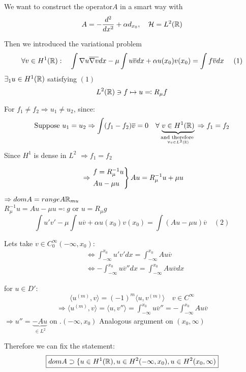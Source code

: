 We want to construct the operator$A$ in a smart way with
	\[ A = - \frac{d^{2}}{dx^{2}} + \alpha d_{x_{0}}, \quad \mathcal{H} = L^{2}(\mathbb{R}) \]
	
Then we introduced the variational problem
	\[ \forall v \in H^{1}(\R): \quad \int \nabla u \overline{\nabla v}dx - \mu \int u \overline{v} dx + \alpha u(x_{0}) v(x_{0}) = \int f \overline{v} dx \quad (1) \]
$\exists_{1} u \in H^{1}(\mathbb{R})$ satisfying $(1)$
	\[ L^{2}(\mathbb{R}) \ni f \mapsto u \eqqcolon R_{\mu} f \]
	
For $f_{1} \neq f_{2} \Rightarrow u_{1} \neq u_{2}$, since:
	\[ \text{Suppose } u_{1} = u_{2} \Rightarrow \int (f_{1} - f_{2}) \overline{v} = 0 \quad \forall \underbrace{v \in H^{1}(\mathbb{R})}_{\underset{\forall v \in L^{2}(\mathbb{R})}{\text{and therefore }}} \Rightarrow f_{1} = f_{2} \]
Since $H^{1}$  is dense in $L^{2}$ $\Longrightarrow f_{1} = f_{2}$

	\[ \Rightarrow \begin{rcases*} f = R^{-1}_{\mu} u \\ A u - \mu u \end{rcases*} Au = R_{\mu}^{-1} u + \mu u \]
	
$\Rightarrow dom A = range A\mathbb{R}_{mu}$ \\
$R_{\mu}^{-1} u = Au - \mu u \eqqcolon g$ or $u = R_{\mu}g$ \\
	\[ \int u' v' - \mu \int u \overline{v} + \alpha u(x_{0}) v(x_{0}) = \int \left( Au - \mu u \right)\overline{v} \quad (2) \]
	
Lets take $v \in C_{0}^{\infty}(-\infty, x_{0})$: 
\begin{align*}
	& \Leftrightarrow \int_{-\infty}^{x_{0}} u' v' dx = \int_{-\infty}^{x_{0}} A u \overline{v} \\
	& \Leftrightarrow - \int_{-\infty}^{x_{0}} u \overline{v}'' dx = \int_{-\infty}^{x_{0}} Au \overline{v} dx
\end{align*}

for $u \in D'$:
	\[ \langle u^{(m)} , v\rangle = (-1)^{m} \langle u , v^{(m)} \rangle \quad v \in C^{\infty} \]
\begin{align*}
	\Rightarrow \langle u^{(m)} , v \rangle = \langle u , v'' \rangle = \int_{-\infty}^{x_{0}} u \overline{v}'' = - \int_{-\infty}^{x_{0}} A u \overline{v}
\end{align*}
$\Rightarrow u'' = \underbrace{- A u}_{\in L^{2}}$ on $.(-\infty, x_{0})$
Analogous argument on $(x_{0}, \infty)$

Therefore we can fix the statement:
\[ \boxed{dom A \supset \{ u \in H^{1}(\mathbb{R}), u \in H^{2}(-\infty, x_{0}), u \in H^{2}(x_{0}, \infty)} \]


